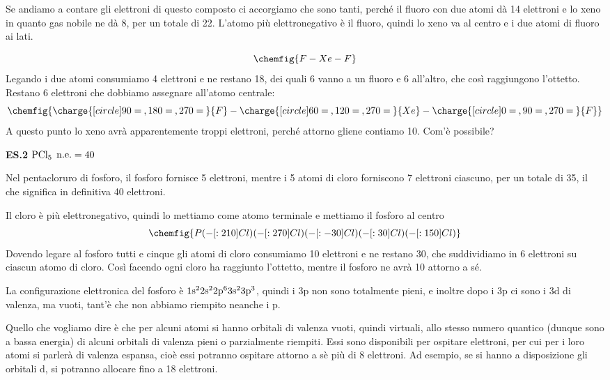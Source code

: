 Se andiamo a contare gli elettroni di questo composto ci accorgiamo che sono tanti, perché il fluoro con due atomi dà 14 elettroni e lo xeno in quanto gas nobile ne dà 8, per un totale di 22. L'atomo più elettronegativo è il fluoro, quindi lo xeno va al centro e i due atomi di fluoro ai lati.

$$
\chemfig{F-Xe-F}
$$
Legando i due atomi consumiamo 4 elettroni e ne restano 18, dei quali 6 vanno a un fluoro e 6 all'altro, che così raggiungono l'ottetto. Restano 6 elettroni che dobbiamo assegnare all'atomo centrale:
$$
\chemfig{\charge{[circle]90=\:,180=\:,270=\:}{F}-\charge{[circle]60=\:,120=\:,270=\:}{Xe}-\charge{[circle]0=\:,90=\:,270=\:}{F}}
$$
A questo punto lo xeno avrà apparentemente troppi elettroni, perché attorno gliene contiamo 10. Com'è possibile?

\vspace{0.2cm}\textbf{ES.2} $\rm PCl_5$ $\rm n.e.=40$

Nel pentacloruro di fosforo, il fosforo fornisce 5 elettroni, mentre i 5 atomi di cloro forniscono 7 elettroni ciascuno, per un totale di 35, il che significa in definitiva 40 elettroni.

Il cloro è più elettronegativo, quindi lo mettiamo come atomo terminale e mettiamo il fosforo al centro
$$
\chemfig{P(-[:210]Cl)(-[:270]Cl)(-[:-30]Cl)(-[:30]Cl)(-[:150]Cl)}
$$
Dovendo legare al fosforo tutti e cinque gli atomi di cloro consumiamo 10 elettroni e ne restano 30, che suddividiamo in 6 elettroni su ciascun atomo di cloro. Così facendo ogni cloro ha raggiunto l'ottetto, mentre il fosforo ne avrà 10 attorno a sé.

La configurazione elettronica del fosforo è $\rm 1s^22s^22p^63s^23p^3$, quindi i 3p non sono totalmente pieni, e inoltre dopo i 3p ci sono i 3d di valenza, ma vuoti, tant'è che non abbiamo riempito neanche i p.

Quello che vogliamo dire è che per alcuni atomi si hanno orbitali di valenza vuoti, quindi virtuali, allo stesso numero quantico (dunque sono a bassa energia) di alcuni orbitali di valenza pieni o parzialmente riempiti. Essi sono disponibili per ospitare elettroni, per cui per i loro atomi si parlerà di valenza espansa, cioè essi potranno ospitare attorno a sè più di 8 elettroni. Ad esempio, se si hanno a disposizione gli orbitali d, si potranno allocare fino a 18 elettroni.